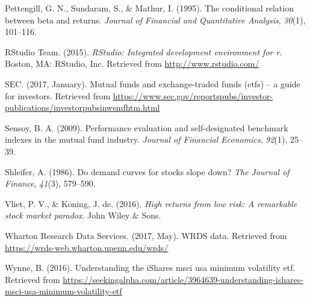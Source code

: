\documentclass[12pt,twoside]{reedthesis}
\theoremstyle{definition}
\theoremstyle{definition}
\theoremstyle{definition}
\theoremstyle{remark}
\begin{document}
\hypertarget{ref-pettengill1995}{}
Pettengill, G. N., Sundaram, S., \& Mathur, I. (1995). The conditional
relation between beta and returns. \emph{Journal of Financial and
Quantitative Analysis}, \emph{30}(1), 101--116.

\hypertarget{ref-rstudio2017}{}
RStudio Team. (2015). \emph{RStudio: Integrated development environment
for r}. Boston, MA: RStudio, Inc. Retrieved from
\url{http://www.rstudio.com/}

\hypertarget{ref-sec2017}{}
SEC. (2017, January). Mutual funds and exchange-traded funds (etfs) -- a
guide for investors. Retrieved from
\url{https://www.sec.gov/reportspubs/investor-publications/investorpubsinwsmfhtm.html}

\hypertarget{ref-sensoy2009}{}
Sensoy, B. A. (2009). Performance evaluation and self-designated
benchmark indexes in the mutual fund industry. \emph{Journal of
Financial Economics}, \emph{92}(1), 25--39.

\hypertarget{ref-shleifer1986}{}
Shleifer, A. (1986). Do demand curves for stocks slope down? \emph{The
Journal of Finance}, \emph{41}(3), 579--590.

\hypertarget{ref-van2016}{}
Vliet, P. V., \& Koning, J. de. (2016). \emph{High returns from low
risk: A remarkable stock market paradox}. John Wiley \& Sons.

\hypertarget{ref-wrds2017}{}
Wharton Research Data Services. (2017, May). WRDS data. Retrieved from
\url{https://wrds-web.wharton.upenn.edu/wrds/}

\hypertarget{ref-wynne2016}{}
Wynne, B. (2016). Understanding the iShares msci usa minimum volatility
etf. Retrieved from
\url{https://seekingalpha.com/article/3964639-understanding-ishares-msci-usa-minimum-volatility-etf}


\end{document}
